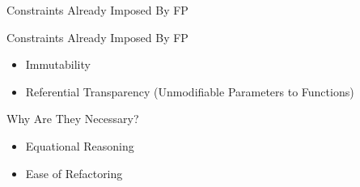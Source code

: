 \begin{section}{Constraints Already Imposed By FP}

\begin{frame}{Constraints Already Imposed By FP}
  \begin{itemize}
  \item Immutability
  \item Referential Transparency (Unmodifiable Parameters to Functions)
  \end{itemize}
\end{frame}

\begin{frame}{Why Are They Necessary?}
  \begin{itemize}
  \item Equational Reasoning
  \item Ease of Refactoring
  \end{itemize}
\end{frame}

\end{section}

